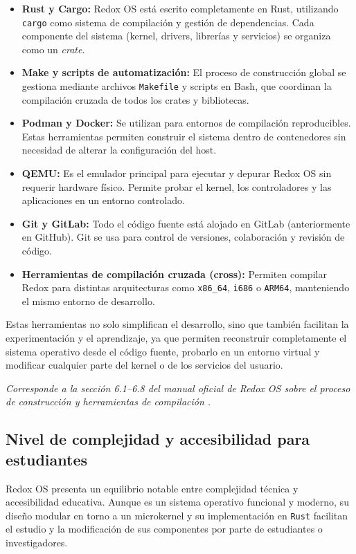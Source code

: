 \begin{itemize}
    \item \textbf{Rust y Cargo:} Redox OS está escrito completamente en Rust, utilizando \texttt{cargo} como sistema de compilación y gestión de dependencias. Cada componente del sistema (kernel, drivers, librerías y servicios) se organiza como un \textit{crate}.
    \item \textbf{Make y scripts de automatización:} El proceso de construcción global se gestiona mediante archivos \texttt{Makefile} y scripts en Bash, que coordinan la compilación cruzada de todos los crates y bibliotecas.
    \item \textbf{Podman y Docker:} Se utilizan para entornos de compilación reproducibles. Estas herramientas permiten construir el sistema dentro de contenedores sin necesidad de alterar la configuración del host.
    \item \textbf{QEMU:} Es el emulador principal para ejecutar y depurar Redox OS sin requerir hardware físico. Permite probar el kernel, los controladores y las aplicaciones en un entorno controlado.
    \item \textbf{Git y GitLab:} Todo el código fuente está alojado en GitLab (anteriormente en GitHub). Git se usa para control de versiones, colaboración y revisión de código.
    \item \textbf{Herramientas de compilación cruzada (cross):} Permiten compilar Redox para distintas arquitecturas como \texttt{x86\_64}, \texttt{i686} o \texttt{ARM64}, manteniendo el mismo entorno de desarrollo.
\end{itemize}

Estas herramientas no solo simplifican el desarrollo, sino que también facilitan la experimentación y el aprendizaje, ya que permiten reconstruir completamente el sistema operativo desde el código fuente, probarlo en un entorno virtual y modificar cualquier parte del kernel o de los servicios del usuario.

\textit{Corresponde a la sección 6.1–6.8 del manual oficial de Redox OS sobre el proceso de construcción y herramientas de compilación \citep{redox_build_process}.}


\subsection{Nivel de complejidad y accesibilidad para estudiantes}

Redox OS presenta un equilibrio notable entre complejidad técnica y accesibilidad educativa.  
Aunque es un sistema operativo funcional y moderno, su diseño modular en torno a un microkernel y su implementación en \texttt{Rust} facilitan el estudio y la modificación de sus componentes por parte de estudiantes o investigadores.

